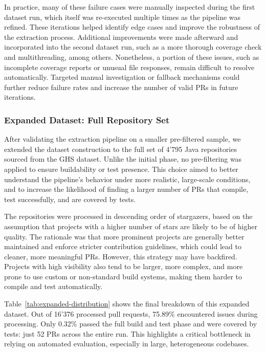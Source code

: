 In practice, many of these failure cases were manually inspected during the first dataset run, which
itself was re-executed multiple times as the pipeline was refined. These iterations helped identify
edge cases and improve the robustness of the extraction process. Additional improvements were made
afterward and incorporated into the second dataset run, such as a more thorough coverage check and
multithreading, among others. Nonetheless, a portion of these issues, such as incomplete
coverage reports or unusual file responses, remain difficult to resolve automatically. Targeted
manual investigation or fallback mechanisms could further reduce failure rates and increase the
number of valid PRs in future iterations.

\subsubsection{Expanded Dataset: Full Repository Set}

After validating the extraction pipeline on a smaller pre-filtered sample, we extended the dataset
construction to the full set of 4'795 Java repositories sourced from the GHS dataset. Unlike the
initial phase, no pre-filtering was applied to ensure buildability or test presence. This choice
aimed to better understand the pipeline’s behavior under more realistic, large-scale conditions, and
to increase the likelihood of finding a larger number of PRs that compile, test successfully, and
are covered by tests.

The repositories were processed in descending order of stargazers, based on the assumption that
projects with a higher number of stars are likely to be of higher quality. The rationale was that
more prominent projects are generally better maintained and enforce stricter contribution
guidelines, which could lead to cleaner, more meaningful PRs. However, this strategy may have
backfired. Projects with high visibility also tend to be larger, more complex, and more prone to use
custom or non-standard build systems, making them harder to compile and test automatically.

Table~\ref{tab:expanded-distribution} shows the final breakdown of this expanded dataset. Out of
16'376 processed pull requests, 75.89\% encountered issues during processing. Only 0.32\% passed the
full build and test phase and were covered by tests: just 52 PRs across the entire run. This
highlights a critical bottleneck in relying on automated evaluation, especially in large,
heterogeneous codebases.

